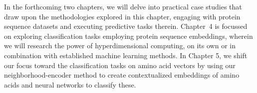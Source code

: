 In the forthcoming two chapters, we will delve into practical case studies that draw upon the methodologies explored in this chapter, engaging with protein sequence datasets and executing predictive tasks therein. \mbox{Chapter 4} is focussed on exploring classification tasks employing protein sequence embeddings, wherein we will research the power of hyperdimensional computing, on its own or in combination with established machine learning methods. In Chapter 5, we shift our focus toward the classification tasks on amino acid vectors by using our neighborhood-encoder method to create contextualized embeddings of amino acids and neural networks to classify these.